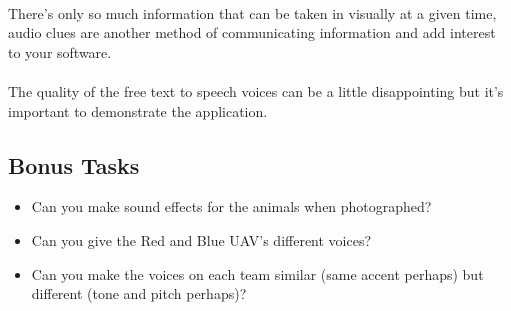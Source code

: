 \documentclass[11pt]{book}
\begin{document}
\paragraph{} There's only so much information that can be taken in visually at a given time, audio clues are another method of communicating information and add interest to your software.

\paragraph{} The quality of the free text to speech voices can be a little disappointing but it's important to demonstrate the application.

\subsection{Bonus Tasks}

\begin{itemize}
\item Can you make sound effects for the animals when photographed?
\item Can you give the Red and Blue UAV's different voices?
\item Can you make the voices on each team similar (same accent perhaps) but different (tone and pitch perhaps)?
\end{itemize}
\end{document}
